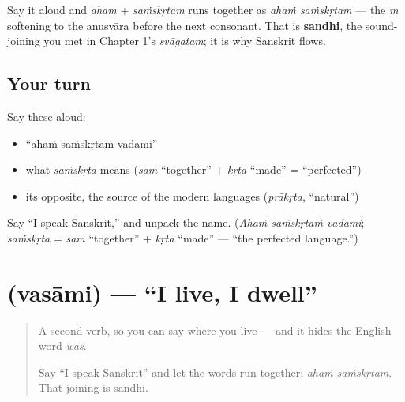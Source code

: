\begin{grammarlens}[title={Grammar Lens: sandhi joins the words}]
Say it aloud and \emph{aham} + \emph{saṁskṛtam} runs together as \emph{ahaṁ saṁskṛtam} — the \emph{m} softening to the anusvāra before the next consonant. That is \textbf{sandhi}, the sound-joining you met in Chapter 1's \emph{svāgatam}; it is why Sanskrit flows.
\end{grammarlens}

\subsection*{Your turn}
Say these aloud:

\begin{itemize}
\raggedright
  \item \textquotedblleft{}ahaṁ saṁskṛtaṁ vadāmi\textquotedblright{}
  \item what \emph{saṁskṛta} means (\emph{sam} \textquotedblleft{}together\textquotedblright{} + \emph{kṛta} \textquotedblleft{}made\textquotedblright{} = \textquotedblleft{}perfected\textquotedblright{})
  \item its opposite, the source of the modern languages (\emph{prākṛta}, \textquotedblleft{}natural\textquotedblright{})
\end{itemize}

\begin{tcolorbox}[breakable,colback=teal!4,colframe=teal!35!black,title={Before you move on}]
Say \textquotedblleft{}I speak Sanskrit,\textquotedblright{} and unpack the name. (\emph{Ahaṁ saṁskṛtaṁ vadāmi}; \emph{saṁskṛta} = \emph{sam} \textquotedblleft{}together\textquotedblright{} + \emph{kṛta} \textquotedblleft{}made\textquotedblright{} — \textquotedblleft{}the perfected language.\textquotedblright{})
\end{tcolorbox}
\section[\texorpdfstring{\sk{वसामि} (vasāmi)}{वसामि (vasāmi)}]{ (vasāmi) — \textquotedblleft{}I live, I dwell\textquotedblright{}}

\label{lesson:SA-C05-vasami}



\begin{quote}
A second verb, so you can say where you live — and it hides the English word \emph{was}.

Say \textquotedblleft{}I speak Sanskrit\textquotedblright{} and let the words run together: \emph{ahaṁ saṁskṛtam}. That joining is sandhi.
\end{quote}

